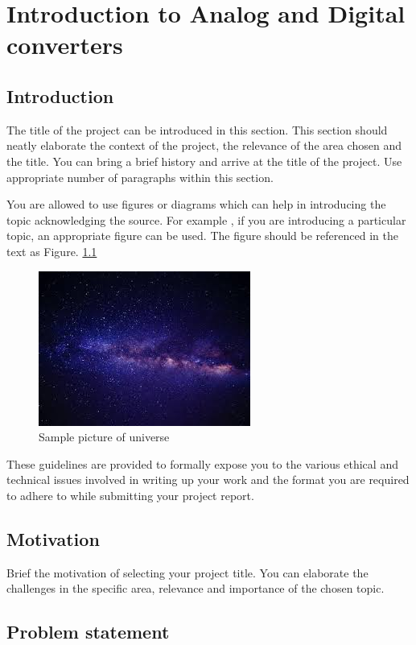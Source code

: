 \chapter{Introduction to Analog and Digital converters}

\section[Introduction]{\textbf{Introduction}}
The title of the project can be introduced in this section. This section should neatly elaborate the context of the project, the relevance of the area chosen and the title. You can bring a brief history and arrive at the title of the project. Use appropriate number of paragraphs within this section. 

You are allowed to use figures or diagrams which can help in introducing the topic acknowledging the source. For example , if you are introducing a particular topic, an appropriate figure can be used. The figure should be referenced in the text as Figure. \ref{fig:universe} 
\begin{figure}[htb]
\centering
	\includegraphics[scale=1]{Figures/universe}	
	\caption{Sample picture of universe }
	\label{fig:universe}
\end{figure}

These guidelines are provided to formally expose you to the various ethical and technical issues involved in writing up your work and the format you are required to adhere to while submitting your project report.

\section[Motivation]{\textbf{Motivation}}

Brief the motivation of selecting your project title. You can elaborate the challenges in the specific area, relevance and importance of the chosen topic. 

\section[Problem statement]{\textbf{Problem statement}}

